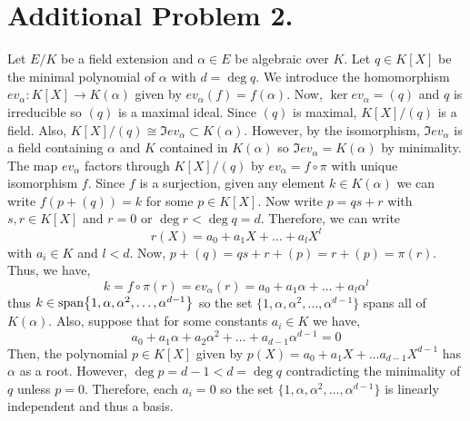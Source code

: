 \documentclass[12pt]{extarticle}
\begin{document}
\section*{Additional Problem 2.} 
Let $E / K$ be a field extension and $\alpha \in E$ be algebraic over $K$. Let $q \in K[X]$ be the minimal polynomial of $\alpha$ with $d = \deg{q}$. We introduce the homomorphism $ev_\alpha : K[X] \to K(\alpha)$ given by $ev_\alpha(f) = f(\alpha)$. Now, $\ker{ev_\alpha} = (q)$ and $q$ is irreducible so $(q)$ is a maximal ideal. Since $(q)$ is maximal, $K[X]/(q)$ is a field. Also, $K[X] / (q) \cong \Im{ev_\alpha} \subset K(\alpha)$. However, by the isomorphism, $\Im{ev_\alpha}$ is a field containing $\alpha$ and $K$ contained in $K(\alpha)$ so $\Im{ev_\alpha} = K(\alpha)$ by minimality. The map $ev_\alpha$ factors through $K[X]/(q)$ by $ev_\alpha = f \circ \pi$ with unique isomorphism $f$. Since $f$ is a surjection, given any element $k \in K(\alpha)$ we can write $f(p + (q)) = k$ for some $p \in K[X]$. Now write $p = qs + r$ with $s, r \in K[X]$ and $r = 0$ or $\deg{r} < \deg{q} = d$. Therefore, we can write \[r(X) = a_0 + a_1 X + \dots + a_l X^l\]
with $a_i \in K$ and $l < d$. Now, $p + (q) = qs + r + (p) = r + (p) = \pi(r)$. 
Thus, we have, \[k = f \circ \pi(r) = ev_\alpha(r) = a_0 + a_1 \alpha + \dots + a_{l} \alpha^{l}\] 
thus $k \in \mathrm{span}\! \left\{1, \alpha, \alpha^2, \dots, \alpha^{d-1} \right\}$ so the set $\{1, \alpha, \alpha^2, \dots, \alpha^{d-1} \}$ spans all of $K(\alpha)$. Also, suppose that for some constants $a_i \in K$ we have,
\[a_0 + a_1 \alpha + a_2 \alpha^2 + \dots + a_{d-1} \alpha^{d-1} = 0\]
Then, the polynomial $p \in K[X]$ given by $p(X) = a_0 + a_1 X + \dots a_{d-1} X^{d-1}$ has $\alpha$ as a root. However, $\deg{p} = d - 1 < d = \deg{q}$ contradicting the minimality of $q$ unless $p = 0$. Therefore, each $a_i = 0$ so the set $\{1, \alpha, \alpha^2, \dots, \alpha^{d-1}\}$ is linearly independent and thus a basis.
   
\end{document}
